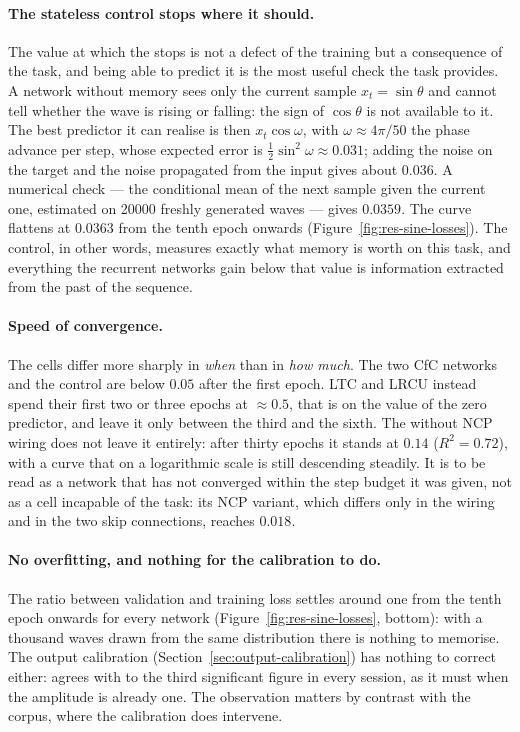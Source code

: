 \paragraph{The stateless control stops where it should.}
The value at which the  stops is not a defect of the training but a
consequence of the task, and being able to predict it is the most useful check
the task provides. A network without memory sees only the current sample
$x_t = \sin\theta$ and cannot tell whether the wave is rising or falling: the
sign of $\cos\theta$ is not available to it. The best predictor it can realise
is then $x_t\cos\omega$, with $\omega \approx 4\pi/50$ the phase advance per
step, whose expected error is $\tfrac12\sin^2\omega \approx 0.031$; adding the
noise on the target and the noise propagated from the input gives about
$0.036$. A numerical check --- the conditional mean of the next sample given the
current one, estimated on \num{20000} freshly generated waves --- gives
$0.0359$. The  curve flattens at $0.0363$ from the tenth epoch onwards
(Figure~\ref{fig:res-sine-losses}). The control, in other words, measures
exactly what memory is worth on this task, and everything the recurrent
networks gain below that value is information extracted from the past of the
sequence.

\paragraph{Speed of convergence.}
The cells differ more sharply in \emph{when} than in \emph{how much}. The two
CfC networks and the control are below $0.05$ after the first epoch. LTC and
LRCU instead spend their first two or three epochs at $\approx 0.5$, that is on
the value of the zero predictor, and leave it only between the third and the
sixth. The  without NCP wiring does not leave it entirely: after
thirty epochs it stands at $0.14$ ($R^2 = 0.72$), with a curve that on a
logarithmic scale is still descending steadily. It is to be read as a network
that has not converged within the step budget it was given, not as a cell
incapable of the task: its NCP variant, which differs only in the wiring and in
the two skip connections, reaches $0.018$.

\paragraph{No overfitting, and nothing for the calibration to do.}
The ratio between validation and training loss settles around one from the
tenth epoch onwards for every network (Figure~\ref{fig:res-sine-losses},
bottom): with a thousand waves drawn from the same distribution there is nothing
to memorise. The output calibration (Section~\ref{sec:output-calibration}) has
nothing to correct either:  agrees with  to the
third significant figure in every session, as it must when the amplitude is
already one. The observation matters by contrast with the corpus, where the
calibration does intervene.

